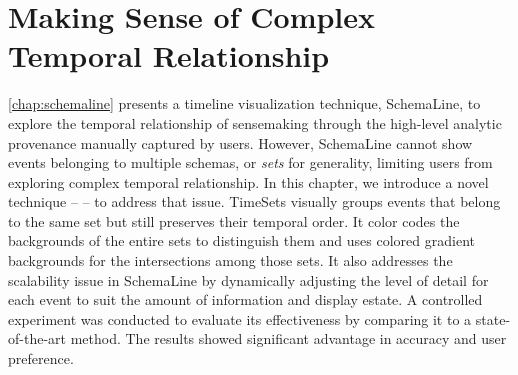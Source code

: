 \chapter{Making Sense of Complex Temporal Relationship}
\label{chap:timesets}

\graphicspath{{Chapter4/figures/}}

\autoref{chap:schemaline} presents a timeline visualization technique, SchemaLine, to explore the temporal relationship of sensemaking through the high-level analytic provenance manually captured by users. However, SchemaLine cannot show events belonging to multiple schemas, or \emph{sets} for generality, limiting users from exploring complex temporal relationship. In this chapter, we introduce a novel technique -- \emph{} -- to address that issue. TimeSets visually groups events that belong to the same set but still preserves their temporal order. It color codes the backgrounds of the entire sets to distinguish them and uses colored gradient backgrounds for the intersections among those sets. It also addresses the scalability issue in SchemaLine by dynamically adjusting the level of detail for each event to suit the amount of information and display estate. A controlled experiment was conducted to evaluate its effectiveness by comparing it to a state-of-the-art method. The results showed significant advantage in accuracy and user preference.










